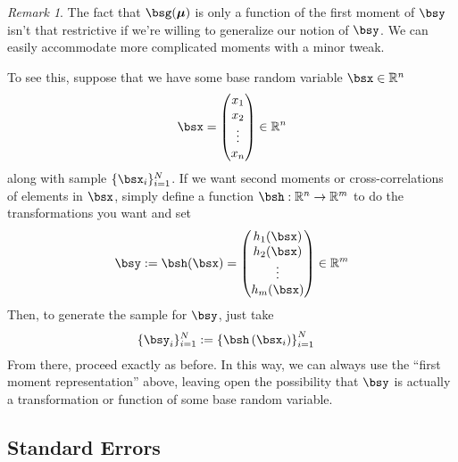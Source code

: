 \documentclass[12pt]{article}
\theoremstyle{plain}
\theoremstyle{definition}
\theoremstyle{remark}
\newtheorem*{rmk}{Remark}
\newcommand{\bsmu}{\boldsymbol{\mu}}
\begin{document}
\begin{rmk}
The fact that $\bsg(\bsmu)$ is only a function
of the first moment of $\bsy$ isn't that restrictive if we're willing to
generalize our notion of $\bsy$. We can easily accommodate more
complicated moments with a minor tweak.

To see this, suppose that we have some base random variable
$\bsx\in\mathbb{R}^n$
\begin{align*}
  \bsx =
  \begin{pmatrix}
    x_1\\x_2\\\vdots\\x_n
  \end{pmatrix}
  \in \mathbb{R}^n
\end{align*}
along with sample $\{\bsx_i\}_{i=1}^N$. If we want second
moments or cross-correlations of elements in $\bsx$, simply
define a function $\bsh: \mathbb{R}^n \rightarrow
\mathbb{R}^m$ to do the transformations you want and set
\begin{align*}
  \bsy
  :=\bsh(\bsx)
  =
  \begin{pmatrix}
    h_1(\bsx)\\h_2(\bsx)\\\vdots\\h_m(\bsx)
  \end{pmatrix}
  \in\mathbb{R}^m
\end{align*}
Then, to generate the sample for $\bsy$, just take
\begin{align*}
  \{\bsy_i\}_{i=1}^N &:=
  \left\{\bsh\left(\bsx_i\right)\right\}_{i=1}^N
\end{align*}
From there, proceed exactly as before. In this way, we can always use
the ``first moment representation'' above, leaving open the possibility
that $\bsy$ is actually a transformation or function of some
base random variable.
\end{rmk}


\subsection{Standard Errors}
\end{document}
